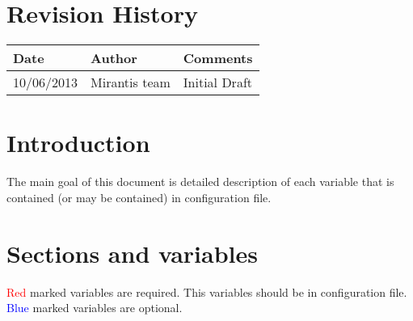 \documentclass[a4paper,11pt]{article}
\begin{document}
\thispagestyle{empty}

\clearpage

\pagestyle{fancy}
\thispagestyle{fancy}
\tableofcontents

\newpage

\section{Revision History}
\begin{tabular}{|l|p{4cm}|p{10cm}|}
\hline
{\bf Date} & {\bf Author} & {\bf Comments} \\ 
\hline
10/06/2013 & Mirantis team & Initial Draft \\ 
\hline
\end{tabular}

\section{Introduction}
The main goal of this document is detailed description of each variable that is contained (or may be contained) in configuration file.

\section{Sections and variables}
\textcolor{red}{Red} marked variables are required. This variables should be in configuration file. \textcolor{blue}{Blue} marked variables are optional. 
\end{document}
